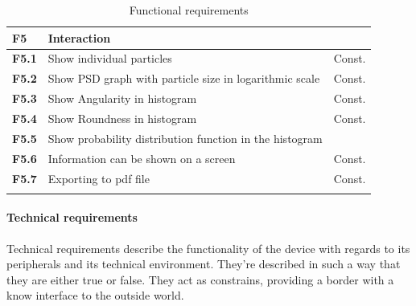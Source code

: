 \documentclass[11pt,fleqn,,a4paper,twoside,openright]{book}
\begin{document}
\begin{longtable}{|p{1cm}| p{10cm} p{1.5cm}|}
\textbf{F5}\label{F5} & \textbf{Interaction} &  \\ 
\hline 
\textbf{F5.1}\label{F5.1} & Show individual particles  & Const. \\ 
\hline 
\textbf{F5.2}\label{F5.2} & Show PSD graph with particle size in logarithmic scale  & Const.  \\ 
\hline 
\textbf{F5.3}\label{F5.3} & Show Angularity in histogram  & Const. \\ 
\hline 
\textbf{F5.4}\label{F5.4} & Show Roundness in histogram & Const. \\ 
\hline 
\textbf{F5.5}\label{F5.5} & Show probability distribution function in the histogram &  \\ 
\hline 
\textbf{F5.6}\label{F5.6} & Information can be shown on a screen & Const. \\
\hline 
\textbf{F5.7}\label{F5.7} & Exporting to pdf file & Const. \\
\hline 
\caption{Functional requirements}\label{tab:FuncReq}
\end{longtable} 

\newpage
\paragraph{Technical requirements}
Technical requirements describe the functionality of the device with regards to its peripherals and its technical environment. They're described in such a way that they are either true or false. They act as constrains, providing a border with a know interface to the outside world.
\end{document}
